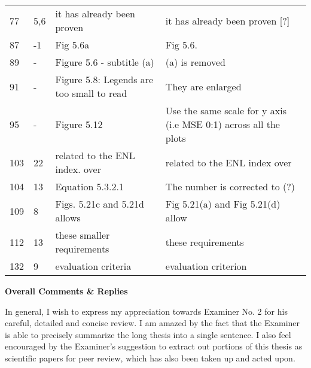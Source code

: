 \begin{longtable}[c]{p{}|p{}|p{}|p{}}
77 & 5,6 & it has already been proven & it has already been proven [?] \\
87 & -1 & Fig 5.6a & Fig 5.6. \\
89 & - & Figure 5.6 - subtitle (a) & (a) is removed \\
91 & - & Figure 5.8: Legends are too small to read & They are enlarged \\
95 & - & Figure 5.12 & Use the same scale for  y axis (i.e MSE 0:1) across all the plots \\
103 & 22 & related to the ENL index. over & related to the ENL index over \\
104 & 13 & Equation 5.3.2.1 & The number is corrected to (?) \\
109 & 8 & Figs. 5.21c and 5.21d allows & Fig 5.21(a) and Fig 5.21(d) allow \\
112 & 13 & these smaller requirements & these requirements \\
132 & 9 & evaluation criteria & evaluation criterion
\end{longtable}    

\textbf{Overall Comments \& Replies}

In general, I wish to express my appreciation towards Examiner No. 2 for his careful, detailed and concise review.
I am amazed by the fact that the Examiner is able to precisely summarize the long thesis into a single sentence.
I also feel encouraged by the Examiner's suggestion to extract out portions of this thesis as scientific papers for peer review, which has also been taken up and acted upon.

